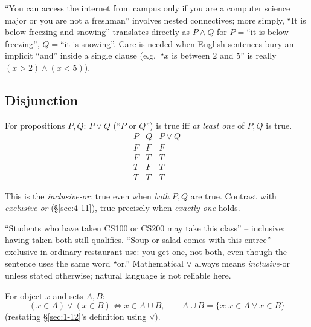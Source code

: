 \documentclass[11pt]{article}
\begin{document}
\begin{example}
``You can access the internet from campus only if you are a computer science major or you are not a freshman'' involves nested connectives; more simply, ``It is below freezing and snowing'' translates directly as $P \wedge Q$ for $P=$``it is below freezing'', $Q=$``it is snowing''. Care is needed when English sentences bury an implicit ``and'' inside a single clause (e.g.\ ``$x$ is between $2$ and $5$'' is really $(x>2)\wedge(x<5)$).
\end{example}

\subsection{Disjunction}
\label{sec:4-7}

\begin{definition}[Disjunction]
For propositions $P,Q$: $P \vee Q$ (``$P$ or $Q$'') is true iff \emph{at least one} of $P,Q$ is true.
\[
\begin{array}{cc|c}
P & Q & P \vee Q \\ \hline
F & F & F \\
F & T & T \\
T & F & T \\
T & T & T
\end{array}
\]
\end{definition}

\begin{note}
This is the \emph{inclusive-or}: true even when \emph{both} $P,Q$ are true. Contrast with \emph{exclusive-or} (\S\ref{sec:4-11}), true precisely when \emph{exactly one} holds.
\end{note}

\begin{example}
``Students who have taken CS100 or CS200 may take this class'' -- inclusive: having taken both still qualifies. ``Soup or salad comes with this entree'' -- exclusive in ordinary restaurant use: you get one, not both, even though the sentence uses the same word ``or.'' Mathematical $\vee$ always means \emph{inclusive}-or unless stated otherwise; natural language is not reliable here.
\end{example}

\begin{note}
For object $x$ and sets $A,B$:
\[
(x \in A) \vee (x \in B) \iff x \in A \cup B, \qquad A \cup B = \{x : x\in A \vee x \in B\}
\]
(restating \S\ref{sec:1-12}'s definition using $\vee$).
\end{note}
\end{document}
